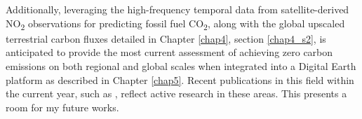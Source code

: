 Additionally, leveraging the high-frequency temporal data from satellite-derived NO\textsubscript{2} observations for predicting fossil fuel CO\textsubscript{2}, along with the global upscaled terrestrial carbon fluxes detailed in Chapter \ref{chap4}, section \ref{chap4_s2}, is anticipated to provide the most current assessment of achieving zero carbon emissions on both regional and global scales when integrated into a Digital Earth platform as described in Chapter \ref{chap5}. Recent publications in this field within the current year, such as \citep{zhang2023quantifying, yang2023using, miyazaki2023predictability}, reflect active research in these areas. This presents a room for my future works.\par